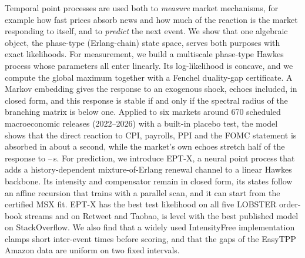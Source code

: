 Temporal point processes are used both to \emph{measure} market mechanisms, for example how fast
prices absorb news and how much of the reaction is the market responding to itself, and to
\emph{predict} the next event. We show that one algebraic object, the phase-type (Erlang-chain)
state space, serves both purposes with exact likelihoods. For measurement, we build a multiscale
phase-type Hawkes process whose parameters all enter linearly. Its log-likelihood is concave, and
we compute the global maximum together with a Fenchel duality-gap certificate. A Markov embedding
gives the response to an exogenous shock, echoes included, in closed form, and this response is
stable if and only if the spectral radius of the branching matrix is below one. Applied to six
markets around 670 scheduled macroeconomic releases (2022--2026) with a built-in placebo test, the
model shows that the direct reaction to CPI, payrolls, PPI and the FOMC statement is absorbed in
about a second, while the market's own echoes stretch half of the response to
\tEchoLo--\tEchoHi{}\,s. For prediction, we introduce EPT-X, a neural point process that adds a
history-dependent mixture-of-Erlang renewal channel to a linear Hawkes backbone. Its intensity
and compensator remain in closed form, its states follow an affine recursion that trains with a
parallel scan, and it can start from the certified MSX fit. EPT-X has the best test likelihood on
all five LOBSTER order-book streams and on Retweet and Taobao, is level with the best published
model on StackOverflow. We also find that a widely used
IntensityFree implementation clamps short inter-event times before scoring, and that the gaps of
the EasyTPP Amazon data are uniform on two fixed intervals.
